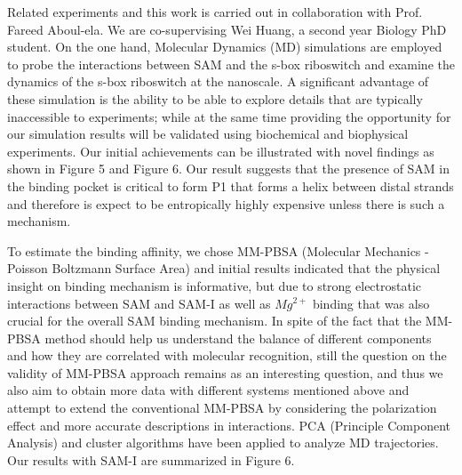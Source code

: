 \documentclass[a4paper,10pt]{article}
\begin{document}
Related experiments and this work is carried out in collaboration with Prof. Fareed Aboul-ela. We are co-supervising Wei Huang, a second year Biology PhD student.
On the one hand, Molecular Dynamics (MD) simulations are employed to probe the interactions between SAM 
and the s-box riboswitch and examine the dynamics of the s-box riboswitch at the nanoscale. A 
significant  
advantage of these simulation is the ability to be able to explore details that are typically inaccessible to experiments; while at the same time providing the opportunity for  
our simulation results will be validated using biochemical and biophysical experiments. Our initial achievements can be illustrated with novel findings as shown in Figure  5 and Figure 6.  Our result suggests that the presence of SAM in the binding pocket is critical to form P1 that forms a helix between distal strands and therefore is expect to be entropically highly expensive  unless there is such a mechanism. 

To estimate the binding affinity, we chose MM-PBSA (Molecular Mechanics - Poisson Boltzmann Surface Area) and initial results indicated that the physical insight on binding mechanism is informative, but due to strong electrostatic interactions between SAM and SAM-I as well as $Mg^{2+}$ binding that was also crucial for the overall SAM binding mechanism. 
In spite of the fact that the MM-PBSA method should help us understand the balance of different components and how
they are correlated with molecular recognition, still the question on the validity of MM-PBSA approach remains as an interesting question, and thus we also aim to obtain more data with different systems mentioned above and attempt to extend the conventional MM-PBSA by considering the polarization effect and more accurate descriptions in interactions. 
PCA (Principle Component Analysis) and cluster
algorithms have been applied to analyze MD trajectories.  Our results with SAM-I are summarized in Figure 6.

\end{document}
